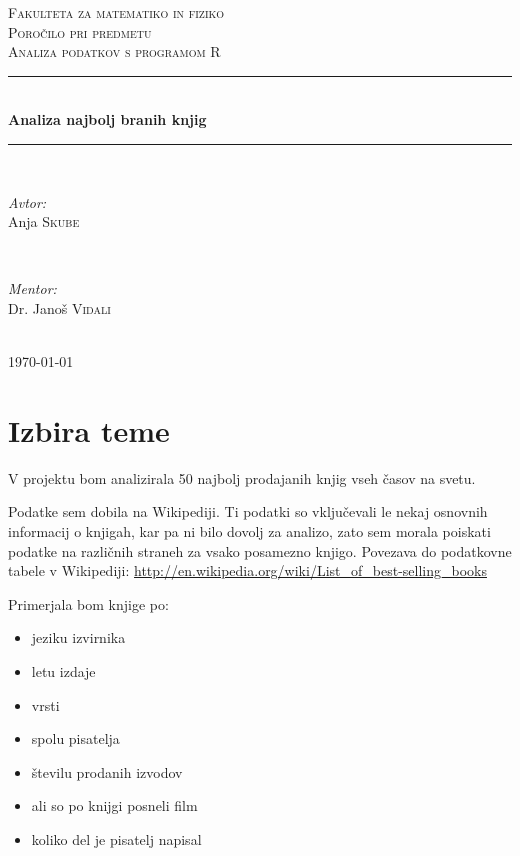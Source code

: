 \documentclass[11pt,a4paper]{article}
\begin{document}
\begin{titlepage}
\newcommand{\HRule}{\rule{\linewidth}{0.5mm}}
\center
\textsc{\LARGE Fakulteta za matematiko in fiziko}\\[3 cm]
\textsc{\Large Poročilo pri predmetu}\\[0.5cm]
\textsc{\large Analiza podatkov s programom R}\\[2 cm]
\HRule \\[0.4cm]
{ \huge \bfseries Analiza najbolj branih knjig}\\[0.4cm]
\HRule \\[6 cm]
\begin{minipage}{0.4\textwidth}
\begin{flushleft} \large
\emph{Avtor:}\\
Anja \textsc{Skube}
\end{flushleft}
\end{minipage}
~
\begin{minipage}{0.4\textwidth}
\begin{flushright} \large
\emph{Mentor:} \\
Dr. Janoš \textsc{Vidali}
\end{flushright}
\end{minipage}\\[2 cm]
{\large \today}\\[3cm]
\end{titlepage}


\section{Izbira teme}

V projektu bom analizirala 50 najbolj prodajanih knjig vseh časov na svetu. 

Podatke sem dobila na Wikipediji. Ti podatki so vključevali le nekaj osnovnih informacij o knjigah, kar pa ni bilo dovolj za analizo, zato sem morala poiskati podatke na različnih straneh za vsako posamezno knjigo. 
Povezava do podatkovne tabele v Wikipediji:
\url{http://en.wikipedia.org/wiki/List_of_best-selling_books}

Primerjala bom knjige po:

\begin{itemize}
\item jeziku izvirnika
\item letu izdaje
\item vrsti
\item spolu pisatelja
\item številu prodanih izvodov
\item ali so po knijgi posneli film
\item koliko del je pisatelj napisal
\end{itemize}
\end{document}
